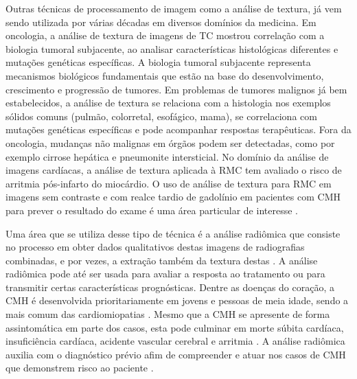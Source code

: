 Outras técnicas de processamento de imagem como a análise de textura, já vem sendo utilizada por várias décadas em diversos domínios da medicina. Em oncologia, a análise de textura de imagens de \gls{TC} mostrou correlação com a biologia tumoral subjacente, ao analisar características histológicas diferentes e mutações genéticas específicas. A biologia tumoral subjacente representa mecanismos biológicos fundamentais que estão na base do desenvolvimento, crescimento e progressão de tumores. Em problemas de tumores malignos já bem estabelecidos, a análise de textura se relaciona com a histologia nos exemplos sólidos comuns (pulmão, colorretal, esofágico, mama), se correlaciona com mutações genéticas específicas e pode acompanhar respostas terapêuticas. Fora da oncologia, mudanças não malignas em órgãos podem ser detectadas, como por exemplo cirrose hepática e pneumonite intersticial. No domínio da análise de imagens cardíacas, a análise de textura aplicada à \gls{RMC} tem avaliado o risco de arritmia pós-infarto do miocárdio. O uso de análise de textura para \gls{RMC} em imagens sem contraste e com realce tardio de gadolínio em pacientes com \gls{CMH} para prever o resultado do exame é uma área particular de interesse \cite{schofieldTextureAnalysisCardiovascular2019a}.


Uma área que se utiliza desse tipo de técnica é a análise radiômica que consiste no processo em obter dados qualitativos destas imagens de radiografias combinadas, e por vezes, a extração também da textura destas \cite{lambinRadiomicsExtractingMore2012}. A análise radiômica pode até ser usada para avaliar a resposta ao tratamento ou para transmitir certas características prognósticas. Dentre as doenças do coração, a \gls{CMH} é desenvolvida prioritariamente em jovens e pessoas de meia idade, sendo a mais comum das cardiomiopatias . Mesmo que a \gls{CMH} se apresente de forma assintomática em parte dos casos, esta pode culminar em morte súbita cardíaca, insuficiência cardíaca, acidente vascular cerebral e arritmia . A análise radiômica auxilia com o diagnóstico prévio afim de compreender e atuar nos casos de \gls{CMH} que demonstrem risco ao paciente \cite{kwonComparisonMortalityCause2022}.



